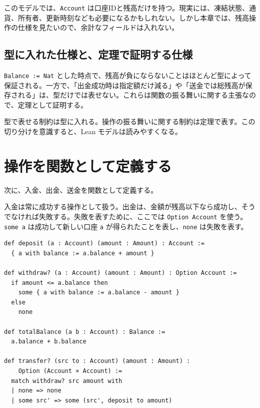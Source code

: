 このモデルでは、\texttt{Account} は口座IDと残高だけを持つ。現実には、凍結状態、通貨、所有者、更新時刻なども必要になるかもしれない。しかし本章では、残高操作の仕様を見たいので、余計なフィールドは入れない。

\subsection{型に入れた仕様と、定理で証明する仕様}

\texttt{Balance := Nat} とした時点で、残高が負にならないことはほとんど型によって保証される。一方で、「出金成功時は指定額だけ減る」や「送金では総残高が保存される」は、型だけでは表せない。これらは関数の振る舞いに関する主張なので、定理として証明する。

\begin{softwarebox}
型で表せる制約は型に入れる。操作の振る舞いに関する制約は定理で表す。この切り分けを意識すると、Lean モデルは読みやすくなる。
\end{softwarebox}

\section{操作を関数として定義する}

次に、入金、出金、送金を関数として定義する。

入金は常に成功する操作として扱う。出金は、金額が残高以下なら成功し、そうでなければ失敗する。失敗を表すために、ここでは \texttt{Option Account} を使う。\texttt{some a} は成功して新しい口座 \texttt{a} が得られたことを表し、\texttt{none} は失敗を表す。

\begin{listing}[htbp]
\begin{verbatim}
def deposit (a : Account) (amount : Amount) : Account :=
  { a with balance := a.balance + amount }

def withdraw? (a : Account) (amount : Amount) : Option Account :=
  if amount <= a.balance then
    some { a with balance := a.balance - amount }
  else
    none

def totalBalance (a b : Account) : Balance :=
  a.balance + b.balance

def transfer? (src to : Account) (amount : Amount) :
    Option (Account × Account) :=
  match withdraw? src amount with
  | none => none
  | some src' => some (src', deposit to amount)
\end{verbatim}
\caption{入金・出金・送金の定義}
\label{lst:ch19-operations}
\end{listing}

